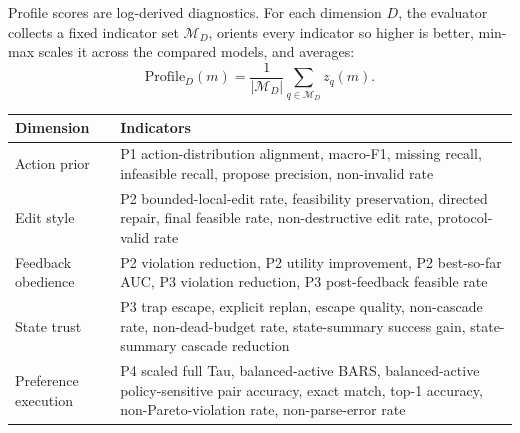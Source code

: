 Profile scores are log-derived diagnostics. For each dimension \(D\), the evaluator collects a fixed indicator set \(\mathcal{M}_D\), orients every indicator so higher is better, min-max scales it across the compared models, and averages:
\begin{equation}
\mathrm{Profile}_D(m)
=
\frac{1}{|\mathcal{M}_D|}
\sum_{q\in\mathcal{M}_D} z_q(m).
\end{equation}

\begin{center}
\label{tab:appendix_profile_indicator_sets}
\scriptsize
\setlength{\tabcolsep}{4pt}
\renewcommand{\arraystretch}{1.08}
\begin{tabular}{lp{115mm}}
\toprule
Dimension & Indicators \\
\midrule
Action prior & P1 action-distribution alignment, macro-F1, missing recall, infeasible recall, propose precision, non-invalid rate \\
Edit style & P2 bounded-local-edit rate, feasibility preservation, directed repair, final feasible rate, non-destructive edit rate, protocol-valid rate \\
Feedback obedience & P2 violation reduction, P2 utility improvement, P2 best-so-far AUC, P3 violation reduction, P3 post-feedback feasible rate \\
State trust & P3 trap escape, explicit replan, escape quality, non-cascade rate, non-dead-budget rate, state-summary success gain, state-summary cascade reduction \\
Preference execution & P4 scaled full Tau, balanced-active BARS, balanced-active policy-sensitive pair accuracy, exact match, top-1 accuracy, non-Pareto-violation rate, non-parse-error rate \\
\bottomrule
\end{tabular}
\end{center}
